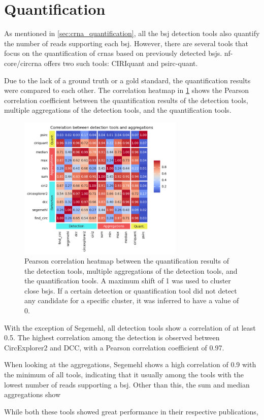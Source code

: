 \section{Quantification}

As mentioned in \cref{sec:crna_quantification}, all the \gls{bsj} detection
tools also quantify the number of reads supporting each \gls{bsj}.
However, there are several tools that focus on the quantification of
\gls{crna}s based on previously detected \gls{bsj}s.
nf-core/circrna offers two such tools: CIRIquant and psirc-quant.

Due to the lack of a ground truth or a gold standard, the quantification
results were compared to each other.
The correlation heatmap in \cref{fig:quantification_correlation_heatmap} shows
the Pearson correlation coefficient between the quantification results of the
detection tools, multiple aggregations of the detection tools, and the
quantification tools.

\begin{figure}[ht]
    \centering

    \includegraphics[width=0.7\textwidth]{chapters/4_results_and_discussion/figures/quantification/correlation_heatmap.png}
    \caption{Pearson correlation heatmap between the quantification results of
        the
        detection tools, multiple aggregations of the detection tools, and the
        quantification tools.
        A maximum shift of 1 was used to cluster close \gls{bsj}s.
        If a certain detection or quantification tool did not detect any candidate for
        a specific cluster, it was inferred to have a value of 0.
    }
    \label{fig:quantification_correlation_heatmap} \end{figure}

With the exception of Segemehl, all detection tools show a correlation of at
least 0.5.
The highest correlation among the detection is observed between CircExplorer2
and DCC, with a Pearson correlation coefficient of 0.97.

When looking at the aggregations, Segemehl shows a high correlation of 0.9 with
the minimum of all tools, indicating that it usually among the tools with the
lowest number of reads supporting a \gls{bsj}.
Other than this, the sum and median aggregations show 

While both these tools showed great performance in their respective
publications,
